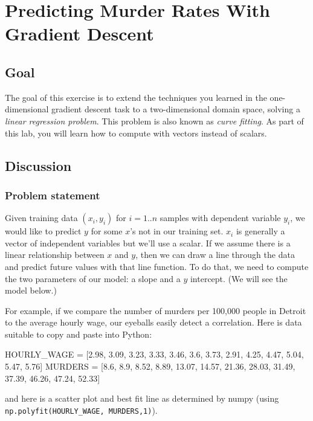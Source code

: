 \chapter{Predicting Murder Rates With Gradient Descent}

\section{Goal}

\begin{fullwidth}

The goal of this exercise is to extend the techniques you learned in the one-dimensional gradient descent task to a two-dimensional domain space, solving a {\em linear regression problem}.  This problem is also known as {\em curve fitting}.  As part of this lab, you will learn how to compute with vectors instead of scalars.

\section{Discussion}

\subsection{Problem statement}

Given training data $(x_i, y_i)$ for $i=1..n$ samples with dependent variable $y_i$, we would like to predict $y$ for some $x$'s not in our training set. $x_i$ is generally a vector of independent variables but we'll use a scalar. If we assume there is a linear relationship between $x$ and $y$, then we can draw a line through the data and predict future values with that line function. To do that, we need to compute the two parameters of our model: a slope and a $y$ intercept. (We will see the model below.)

For example, if we compare the number of murders per 100,000 people in Detroit to the average hourly wage, our eyeballs easily detect a correlation.  Here is data suitable to copy and paste into Python:

\begin{pyverbatim}
HOURLY_WAGE = [2.98, 3.09, 3.23, 3.33, 3.46, 3.6, 3.73, 2.91, 4.25, 4.47, 5.04, 5.47, 5.76]
MURDERS = [8.6, 8.9, 8.52, 8.89, 13.07, 14.57, 21.36, 28.03, 31.49, 37.39, 46.26, 47.24, 52.33]
\end{pyverbatim}

\noindent and here is a scatter plot and best fit line as determined by numpy (using {\tt\footnotesize np.polyfit(HOURLY\_WAGE, MURDERS,1)}).


\end{fullwidth}
